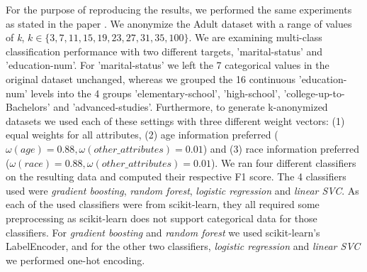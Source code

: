 \documentclass{article}
\begin{document}
For the purpose of reproducing the results, we performed the same experiments as stated in the paper \cite{malle2017not}. We anonymize the Adult dataset with a range of values of \textit{k}, ${k \in \{3, 7, 11, 15, 19, 23, 27, 31, 35, 100\}}$. We are examining multi-class classification performance with two different targets, 'marital-status' and 'education-num'. For 'marital-status' we left the 7 categorical values in the original dataset unchanged, whereas we grouped the 16 continuous 'education-num' levels into the 4 groups 'elementary-school', 'high-school', 'college-up-to-Bachelors' and 'advanced-studies'. 
Furthermore, to generate k-anonymized datasets we used each of these settings with three different weight vectors: (1) equal weights for all attributes, (2) age information preferred (${\omega(age)=0.88, \omega(other\_attributes)=0.01}$) and (3) race information preferred (${\omega(race)=0.88, \omega(other\_attributes)=0.01}$).
We ran four different classifiers on the resulting data and computed their respective F1 score. The 4 classifiers used were \textit{gradient boosting}, \textit{random forest}, \textit{logistic regression} and \textit{linear SVC}. As each of the used classifiers were from scikit-learn, they all required some preprocessing as scikit-learn does not support categorical data for those classifiers. For \textit{gradient boosting} and \textit{random forest} we used scikit-learn's LabelEncoder, and for the other two classifiers,  \textit{logistic regression} and \textit{linear SVC} we performed one-hot encoding.
\end{document}
